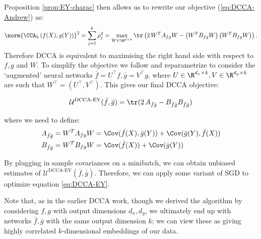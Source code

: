 Proposition \ref{prop:EY-charac} then allows us to rewrite our objective (\ref{eq:DCCA-Andrew}) as:
\begin{align*}
    \norm{\CCA_k\left(f(X),g(Y)\right)}^2 
    = \sum_{j=1}^k \rho_j^2 
    = \max_{W \in \R^{d \times k}} \tr \left( 2\, W^T A_{fg} W - \left(W^T B_{fg} W\right) \left(W^T B_{fg} W\right) \right).
\end{align*}
Therefore DCCA is equivalent to maximising the right hand side with respect to $f,g$ and $W$. To simplify the objective we follow \cite{wang2015stochastic} and reparametrize to consider the `augmented' neural networks $\bar{f} = U^{\top} f, \bar{g} = V^{\top} g$, where $U\in \R^{d_x \times k}, V\in \R^{d_y \times k}$ are such that $W^{\top} = (U^{\top}, V^{\top})$. This gives our final DCCA objective:

\begin{align}\label{eq:DCCA-EY}
    \mathcal{U}^\text{DCCA-EY}(\bar{f},\bar{g}) = \tr(2 \, A_{\bar{f}\bar{g}} - B_{\bar{f}\bar{g}} B_{\bar{f}\bar{g}})
\end{align}

where we need to define:
\begin{align*}
    A_{\bar{f}\bar{g}}
    &= W^T A_{fg} W 
    = \Cov(\bar{f}(X),\bar{g}(Y)) + \Cov(\bar{g}(Y),\bar{f}(X)) \\
    B_{\bar{f}\bar{g}} 
    &= W^T B_{fg} W 
    = \Cov(\bar{f}(X)) + \Cov(\bar{g}(Y))
\end{align*}

By plugging in sample covariances on a minibatch, we can obtain unbiased estimates of $\mathcal{U}^\text{DCCA-EY}(\bar{f},\bar{g})$.
Therefore, we can apply some variant of SGD to optimize equation \ref{eq:DCCA-EY}.

Note that, as in the earlier DCCA work, though we derived the algorithm by considering $f,g$ with output dimensions $d_x,d_y$, we ultimately end up with networks $\bar{f},\bar{g}$ with the same output dimension $k$; we can view these as giving highly correlated $k$-dimensional embeddings of our data.

